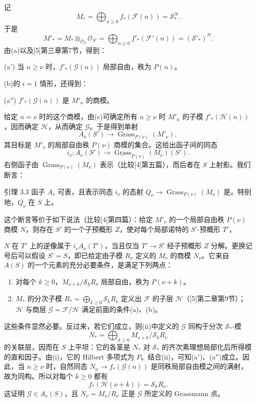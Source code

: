 记
\[
M_* =\bigoplus_{n\geq0}f_*(\mathcal F(n))=\mathcal S_*^N.
\]
于是
\[
M'_*=M_*\otimes_{\mathcal O_S}\mathcal O_{S'}
=\bigoplus_{n\geq0}f'_*(\mathcal F'(n))=(\mathcal S'_*)^N.
\]
由(a)以及[5]第三章第7节，得到：

\noindent(a$'$) 当 $n\geq\nu$ 时，$f'_*(\mathcal G(n))$ 局部自由，秩为 $P(n)$。

(b)的 $i=1$ 情形，还得到：

\noindent(a$''$) $f'_*(\mathcal G(n))$ 是 $M'_n$ 的商模。

给定 $n=\nu$ 时的这个商模，由(c)可确定所有 $n\geq\nu$ 时 $M'_n$ 的子模 $f'_*(\mathcal H(n))$，因而确定 $\mathcal H$，从而确定 $\mathcal G$。于是得到单射
\[
A_\nu(S')\longrightarrow\operatorname{Grass}_{P(\nu)}(M'_\nu),
\]
其目标是 $M'_\nu$ 的局部自由秩 $P(\nu)$ 商模的集合。这给出函子间的同态
\[
i_\nu:A_\nu(S')\longrightarrow
\underline{\operatorname{Grass}}_{P(\nu)}(M_\nu)(S').
\]
右侧函子由 $\operatorname{Grass}_{P(\nu)}(M_\nu)$ 表示（比较[4]第五篇），而后者在 $S$ 上射影。我们断言：

\begin{statement}{引理 3.3}
函子 $A_\nu$ 可表，且表示同态 $i_\nu$ 的态射 $Q_\nu\to\operatorname{Grass}_{P(\nu)}(M_\nu)$ 是。特别地，$Q_\nu$ 在 $S$ 上。
\end{statement}
这个断言等价于如下说法（比较[4]第四篇）：给定 $M'_\nu$ 的一个局部自由秩 $P(\nu)$ 商模 $N$，则存在 $S'$ 的一个子预概形 $Z$，使对每个局部诺特的 $S'$-预概形 $T'$，

$N$ 在 $T'$ 上的逆像属于 $i_\nu A_\nu(T')$，当且仅当 $T'\to S'$ 经子预概形 $Z$ 分解。更换记号后可以假设 $S'=S$，即已给定由子模 $R_\nu$ 定义的 $M_\nu$ 的商模 $N_\nu$。它来自 $A(S)$ 的一个元素的充分必要条件，是满足下列两点：
\begin{enumerate}[label=(\roman*)]
\item 对每个 $k\geq0$，$M_{\nu+k}/\mathcal S_kR_\nu$ 局部自由，秩为 $P(\nu+k)$。
\item $M_*$ 的分次子模 $R_*=\bigoplus_{k\geq0}\mathcal S_kR_\nu$ 定义出 $\mathcal F$ 的子层 $\mathcal H$（[5]第二章第9节）；$\mathcal H$ 与商层 $\mathcal G=\mathcal F/\mathcal H$ 满足前面的条件(a)、(b)。
\end{enumerate}
这些条件显然必要。反过来，若它们成立，则(ii)中定义的 $\mathcal G$ 同构于分次 $\mathcal S_*$-模
\[
N_*=\bigoplus_{k\geq0}M_{\nu+k}/\mathcal S_kR_\nu
\]
的关联层，因而在 $S$ 上平坦：它的各茎是 $N_*$ 对 $\mathcal S_*$ 的齐次素理想局部化后所得模的直和因子。由(i)，它的 Hilbert 多项式为 $P$。结合(ii)，可知(a$'$)、(a$''$)成立。因此，当 $n\geq\nu$ 时，自然同态 $N_n\to f_*(\mathcal G(n))$ 是同秩局部自由模之间的满射，故为同构。所以对每个 $k\geq0$ 都有
\[
f_*(\mathcal H(\nu+k))=\mathcal S_kR_\nu.
\]
这证明 $\mathcal G\in A_\nu(S)$，且 $N_\nu=M_\nu/R_\nu$ 正是 $\mathcal G$ 所定义的 Grassmann 点。

